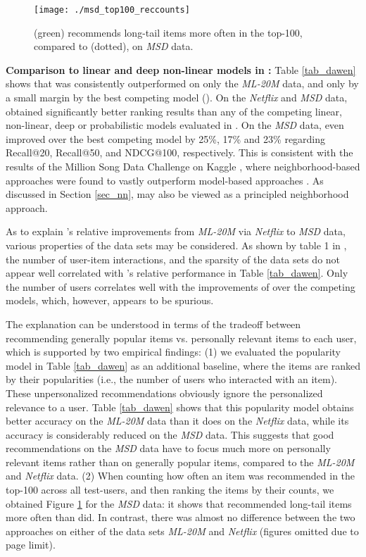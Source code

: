 \documentclass[sigconf]{acmart}
\newcommand{\mvae}{}
\newcommand{\sae}{}
\begin{document}
\begin{figure}[t]
\begin{center}
\texttt{[image: ./msd\_top100\_reccounts]}
\end{center}
\caption{\sae{} (green) recommends  long-tail items more often in the top-100, compared to \mvae{} (dotted), on \emph{MSD} data.}
\label{fig_recs}
\end{figure}



{\bf Comparison to linear and deep non-linear models in \cite{liang18}:}
Table \ref{tab_dawen} shows that \sae{}  was consistently outperformed on only the \emph{ML-20M} data, and only by a small margin by the best competing model (\mvae).  On the  \emph{Netflix} and \emph{MSD} data, \sae{}  obtained significantly better ranking results than any of the competing linear, non-linear, deep or probabilistic models evaluated in \cite{liang18}. On the \emph{MSD} data, \sae{}  even improved over the best competing model by  25\%, 17\% and 23\% regarding Recall@20, Recall@50, and NDCG@100, respectively. This is consistent with the results of the Million Song Data Challenge on Kaggle \cite{mcfee12}, where neighborhood-based approaches were found to vastly outperform model-based approaches \cite{aiolli13}. As discussed in Section \ref{sec_nn}, \sae{}  may also be viewed as a principled neighborhood approach.

As to explain \sae's relative improvements from \emph{ML-20M} via  \emph{Netflix} to \emph{MSD} data, various properties of the data sets may be considered. As shown by table 1 in \cite{liang18}, the number of user-item interactions, and the sparsity of the data sets  do not appear well correlated  with \sae's relative performance in Table \ref{tab_dawen}. Only the number of users correlates well with the improvements of \sae{}  over the competing models, which, however, appears to be spurious.

The explanation can be understood in terms of the tradeoff between recommending generally popular items vs. personally relevant items to each user, which is supported by two empirical findings: (1) we evaluated the popularity model in Table \ref{tab_dawen} as an additional baseline, 
where  the items are ranked by their popularities (i.e.,  the number of users who interacted with an item). These unpersonalized recommendations obviously ignore the personalized relevance to a user. Table \ref{tab_dawen} shows that this  popularity model obtains better accuracy on the \emph{ML-20M} data than it does on the \emph{Netflix} data, while its accuracy is considerably reduced on the \emph{MSD} data. This suggests that good recommendations on the  \emph{MSD} data have to focus much more on personally relevant items rather than on generally popular items, compared to the  \emph{ML-20M} and \emph{Netflix} data. (2) When counting how often an item was recommended in the top-100 across all test-users, and then ranking the items by their counts, we obtained Figure \ref{fig_recs} for the \emph{MSD} data: it shows that \sae{} recommended long-tail items more often than \mvae{} did. In contrast, there was almost no difference  between the two approaches on either of the data sets \emph{ML-20M} and \emph{Netflix} (figures omitted due to page limit).
\end{document}
